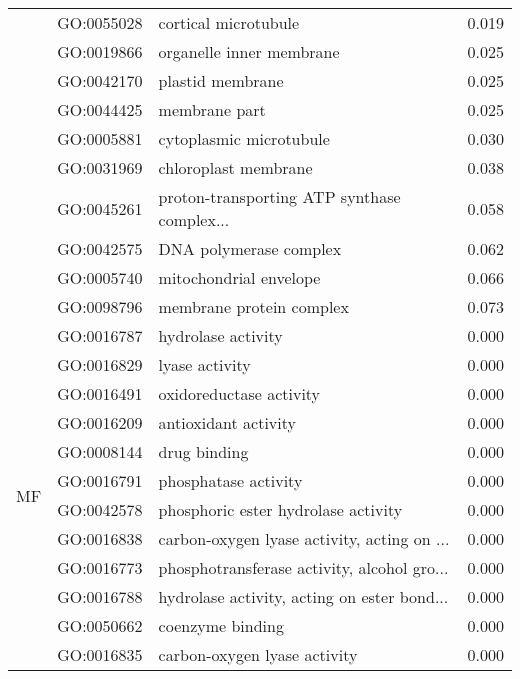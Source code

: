 \begin{longtable}{lllr}
   & GO:0055028 &                         cortical microtubule &         0.019 \\
   & GO:0019866 &                     organelle inner membrane &         0.025 \\
   & GO:0042170 &                             plastid membrane &         0.025 \\
   & GO:0044425 &                                membrane part &         0.025 \\
   & GO:0005881 &                      cytoplasmic microtubule &         0.030 \\
   & GO:0031969 &                         chloroplast membrane &         0.038 \\
   & GO:0045261 &  proton-transporting ATP synthase complex... &         0.058 \\
   & GO:0042575 &                       DNA polymerase complex &         0.062 \\
   & GO:0005740 &                       mitochondrial envelope &         0.066 \\
   & GO:0098796 &                     membrane protein complex &         0.073 \\
\cline{1-4}
\multirow{98}{*}{MF} & GO:0016787 &                           hydrolase activity &         0.000 \\
   & GO:0016829 &                               lyase activity &         0.000 \\
   & GO:0016491 &                      oxidoreductase activity &         0.000 \\
   & GO:0016209 &                         antioxidant activity &         0.000 \\
   & GO:0008144 &                                 drug binding &         0.000 \\
   & GO:0016791 &                         phosphatase activity &         0.000 \\
   & GO:0042578 &          phosphoric ester hydrolase activity &         0.000 \\
   & GO:0016838 &  carbon-oxygen lyase activity, acting on ... &         0.000 \\
   & GO:0016773 &  phosphotransferase activity, alcohol gro... &         0.000 \\
   & GO:0016788 &  hydrolase activity, acting on ester bond... &         0.000 \\
   & GO:0050662 &                             coenzyme binding &         0.000 \\
   & GO:0016835 &                 carbon-oxygen lyase activity &         0.000 \\

\end{longtable}

